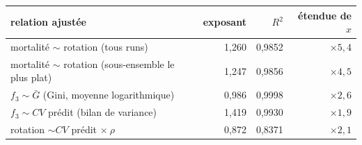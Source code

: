 \begin{tabular}{lrrr}
\toprule
relation ajustée & exposant & $R^2$ & étendue de $x$ \\
\midrule
mortalité $\sim$ rotation (tous runs) & 1,260 & 0,9852 & $\times5,4$ \\
mortalité $\sim$ rotation (sous-ensemble le plus plat) & 1,247 & 0,9856 & $\times4,5$ \\
$f_3 \sim \bar G$ (Gini, moyenne logarithmique) & 0,986 & 0,9998 & $\times2,6$ \\
$f_3 \sim CV$ prédit (bilan de variance) & 1,419 & 0,9930 & $\times1,9$ \\
rotation $\sim CV$ prédit $\times\ \rho$ & 0,872 & 0,8371 & $\times2,1$ \\
\bottomrule
\end{tabular}
